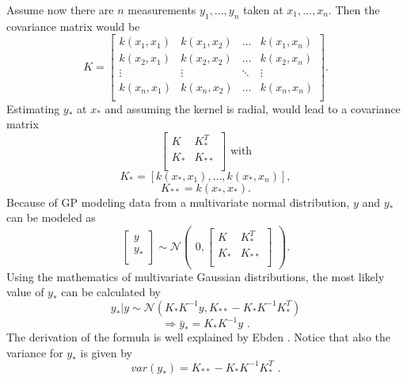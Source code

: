 Assume now there are $n$ measurements $y_1, ..., y_n$ taken at $x_1, ..., x_n$. Then the covariance matrix would be
$$
K = \begin{bmatrix}
k(x_1, x_1) & k(x_1, x_2) & \dots & k(x_1, x_n) \\
k(x_2, x_1) & k(x_2, x_2) & \dots & k(x_2, x_n) \\
\vdots & \vdots & \ddots & \vdots \\
k(x_n, x_1) & k(x_n, x_2) & \dots & k(x_n, x_n) \\
\end{bmatrix}\text{.}
$$
Estimating $y_*$ at $x_*$ and assuming the kernel is radial, would lead to a covariance matrix
$$
\begin{bmatrix}
K & K_*^T \\
K_* & K_{**} \\
\end{bmatrix} \text{ with}
$$
$$
K_* = [k(x_*, x_1), \dots, k(x_*, x_n)],
$$
$$
K_{**} = k(x_*, x_*)\text{.}
$$
Because of GP modeling data from a multivariate normal distribution, $y$ and $y_*$ can be modeled as
$$
\begin{bmatrix}
y \\
y_* \\
\end{bmatrix} 
\sim
\mathcal{N} 
\begin{pmatrix}
0, 
\begin{bmatrix}
K & K_*^T \\
K_* & K_{**} \\
\end{bmatrix}
\end{pmatrix}\text{.}
$$
Using the mathematics of multivariate Gaussian distributions, the most likely value of $y_*$ can be calculated by
$$
y_*|y \sim \mathcal{N}(K_*K^{-1}y, K_{**} - K_*K^{-1}K_*^T)
$$
$$
\Rightarrow \bar{y}_* = K_*K^{-1}y\text{ .}
$$
The derivation of the formula is well explained by Ebden \cite{ebden_gaussian_2015}. Notice that also the variance for $y_*$ is given by
$$
var(y_*) = K_{**} - K_*K^{-1}K_*^T\text{ .}
$$

